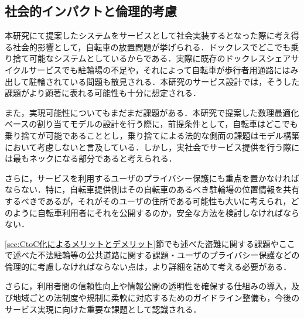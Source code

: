   \subsection{社会的インパクトと倫理的考慮}
    \label{sec:社会的インパクトと倫理的考慮}
      \par 本研究にて提案したシステムをサービスとして社会実装するとなった際に考え得る社会的影響として，自転車の放置問題が挙げられる．ドックレスでどこでも乗り捨て可能なシステムとしているからである．実際に既存のドックレスシェアサイクルサービスでも駐輪場の不足や，それによって自転車が歩行者用通路にはみ出して駐輪されている問題も散見される．本研究のサービス設計では，そうした課題がより顕著に表れる可能性も十分に想定される．
      \par また，実現可能性についてもまだまだ課題がある．本研究で提案した数理最適化ベースの割り当てモデルの設計を行う際に，前提条件として，自転車はどこでも乗り捨てが可能であることとし，乗り捨てによる法的な側面の課題はモデル構築において考慮しないと言及している．しかし，実社会でサービス提供を行う際には最もネックになる部分であると考えられる．
      \par さらに，サービスを利用するユーザのプライバシー保護にも重点を置かなければならない．特に，自転車提供側はその自転車のあるべき駐輪場の位置情報を共有するべきであるが，それがそのユーザの住所である可能性も大いに考えられ，どのように自転車利用者にそれを公開するのか，安全な方法を検討しなければならない．
      \par \ref{sec:CtoC化によるメリットとデメリット}節でも述べた盗難に関する課題やここで述べた不法駐輪等の公共道路に関する課題・ユーザのプライバシー保護などの倫理的に考慮しなければならない点は，より詳細を詰めて考える必要がある．
      \par さらに，利用者間の信頼性向上や情報公開の透明性を確保する仕組みの導入，及び地域ごとの法制度や規制に柔軟に対応するためのガイドライン整備も，今後のサービス実現に向けた重要な課題として認識される．

